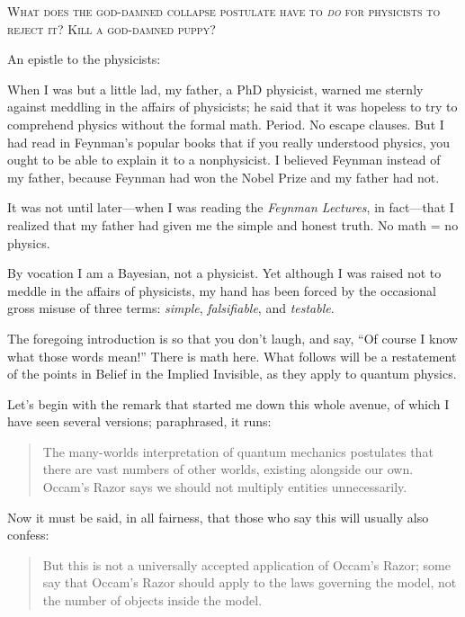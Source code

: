 \textsc{
 What does the god-damned collapse postulate have to {\em do}
for physicists to reject it? Kill a god-damned puppy?}

\myendsectiontext


{
 An epistle to the physicists: }

{
 When I was but a little lad, my father, a PhD physicist, warned me
sternly against meddling in the affairs of physicists; he said that it
was hopeless to try to comprehend physics without the formal math.
Period. No escape clauses. But I had read in Feynman's
popular books that if you really understood physics, you ought to be
able to explain it to a nonphysicist. I believed Feynman instead of my
father, because Feynman had won the Nobel Prize and my father had not.}

{
 It was not until later---when I was reading the \textit{Feynman
Lectures}, in fact---that I realized that my father had given me the
simple and honest truth. No math = no physics.}

{
 By vocation I am a Bayesian, not a physicist. Yet although I was
raised not to meddle in the affairs of physicists, my hand has been
forced by the occasional gross misuse of three terms: \textit{simple},
\textit{falsifiable}, and \textit{testable}.}

{
 The foregoing introduction is so that you don't
laugh, and say, ``Of course I know what those words
mean!'' There is math here. What follows will be a
restatement of the points in Belief in the Implied Invisible, as they
apply to quantum physics.}

{
 Let's begin with the remark that started me down
this whole avenue, of which I have seen several versions; paraphrased,
it runs:}

\begin{quote}
{
 The many-worlds interpretation of quantum mechanics postulates
that there are vast numbers of other worlds, existing alongside our
own. Occam's Razor says we should not multiply entities
unnecessarily.}
\end{quote}

{
 Now it must be said, in all fairness, that those who say this will
usually also confess:}

\begin{quote}
{
 But this is not a universally accepted application of
Occam's Razor; some say that Occam's
Razor should apply to the laws governing the model, not the number of
objects inside the model.}
\end{quote}

